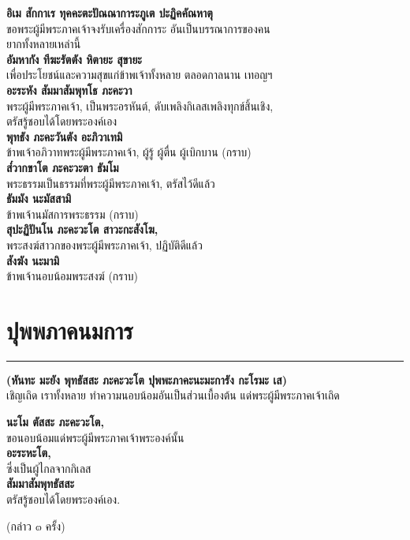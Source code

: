 \documentclass[12pt]{article}
\begin{document}
\textbf{อิเม สักกาเร ทุคคะตะปัณณาการะภูเต ปะฏิคคัณหาตุ}\\
\indent ขอพระผู้มีพระภาคเจ้าจงรับเครื่องสักการะ อันเป็นบรรณาการของคน\\
\indent ยากทั้งหลายเหล่านี้\\
\textbf{อัมหากัง ทีฆะรัตตัง หิตายะ สุขายะ}\\
\indent เพื่อประโยชน์และความสุขแก่ข้าพเจ้าทั้งหลาย ตลอดกาลนาน เทอญฯ\\
\textbf{อะระหัง สัมมาสัมพุทโธ ภะคะวา}\\
\indent พระผู้มีพระภาคเจ้า, เป็นพระอรหันต์, ดับเพลิงกิเลสเพลิงทุกข์สิ้นเชิง,\\
\indent ตรัสรู้ชอบได้โดยพระองค์เอง\\
\textbf{พุทธัง ภะคะวันตัง อะภิวาเทมิ}\\
\indent ข้าพเจ้าอภิวาทพระผู้มีพระภาคเจ้า, ผู้รู้ ผู้ตื่น ผู้เบิกบาน (กราบ)\\
\textbf{ส๎วากขาโต ภะคะวะตา ธัมโม} \\
\indent พระธรรมเป็นธรรมที่พระผู้มีพระภาคเจ้า, ตรัสไว้ดีแล้ว\\
\textbf{ธัมมัง นะมัสสามิ}\\
\indent ข้าพเจ้านมัสการพระธรรม (กราบ)\\
\textbf{สุปะฏิปันโน ภะคะวะโต สาวะกะสังโฆ,}\\
\indent พระสงฆ์สาวกของพระผู้มีพระภาคเจ้า, ปฏิบัติดีแล้ว\\
\textbf{สังฆัง นะมามิ}\\
\indent ข้าพเจ้านอบน้อมพระสงฆ์ (กราบ)

\pagebreak
\section{ปุพพภาคนมการ}
\hrule
\begin{center}
\textbf{(หันทะ มะยัง พุทธัสสะ ภะคะวะโต ปุพพะภาคะนะมะการัง กะโรมะ เส)}\\
เชิญเถิด เราทั้งหลาย ทำความนอบน้อมอันเป็นส่วนเบื้องต้น แด่พระผู้มีพระภาคเจ้าเถิด
\end{center}
\textbf{นะโม ตัสสะ ภะคะวะโต,}\\
\indent ขอนอบน้อมแด่พระผู้มีพระภาคเจ้าพระองค์นั้น\\
\textbf{อะระหะโต,}\\
\indent ซึ่งเป็นผู้ไกลจากกิเลส\\
\textbf{สัมมาสัมพุทธัสสะ}\\
\indent ตรัสรู้ชอบได้โดยพระองค์เอง.	
\begin{center}
(กล่าว ๓ ครั้ง)
\end{center}
\end{document}
